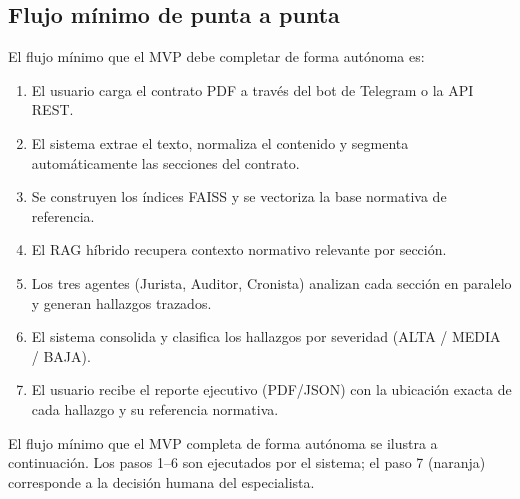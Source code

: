 \subsection{Flujo mínimo de punta a punta}

El flujo mínimo que el MVP debe completar de forma autónoma es:

\begin{enumerate}
    \item El usuario carga el contrato PDF a través del bot de Telegram
    o la API REST.
    \item El sistema extrae el texto, normaliza el contenido y segmenta
    automáticamente las secciones del contrato.
    \item Se construyen los índices FAISS y se vectoriza la base normativa
    de referencia.
    \item El RAG híbrido recupera contexto normativo relevante por sección.
    \item Los tres agentes (Jurista, Auditor, Cronista) analizan cada
    sección en paralelo y generan hallazgos trazados.
    \item El sistema consolida y clasifica los hallazgos por severidad
    (ALTA / MEDIA / BAJA).
    \item El usuario recibe el reporte ejecutivo (PDF/JSON) con la ubicación
    exacta de cada hallazgo y su referencia normativa.
\end{enumerate}

El flujo mínimo que el MVP completa de forma autónoma se ilustra a continuación.
Los pasos 1–6 son ejecutados por el sistema; el paso 7 (naranja) corresponde
a la decisión humana del especialista.


